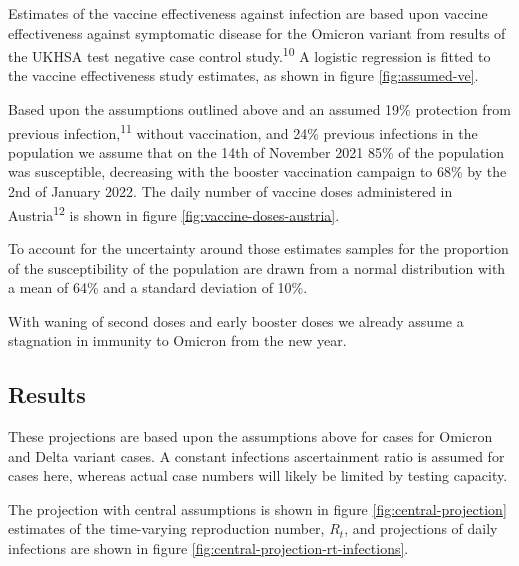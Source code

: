\documentclass[
]{article}
\begin{document}
Estimates of the vaccine effectiveness against infection are based upon vaccine effectiveness against
symptomatic disease for the Omicron variant from results of the UKHSA test negative case control study.\textsuperscript{10}
A logistic regression is fitted to the vaccine effectiveness study estimates, as shown in figure \ref{fig:assumed-ve}.

Based upon the assumptions outlined above and an assumed 19\% protection from previous infection,\textsuperscript{11} without vaccination, and 24\% previous infections in the population we assume that on the 14th of November 2021 85\% of the
population was susceptible, decreasing with the booster vaccination campaign to 68\% by the 2nd of January 2022.
The daily number of vaccine doses administered in Austria\textsuperscript{12} is shown in figure \ref{fig:vaccine-doses-austria}.

To account for the uncertainty around those estimates samples for the proportion of the susceptibility
of the population are drawn from a normal distribution with a mean of 64\% and a standard
deviation of 10\%.

With waning of second doses and early booster doses we already assume a stagnation in immunity
to Omicron from the new year.

\hypertarget{results}{%
\subsection{Results}\label{results}}

These projections are based upon the assumptions above for cases for Omicron and Delta variant cases.
A constant infections ascertainment ratio is assumed for cases here, whereas actual case numbers
will likely be limited by testing capacity.

The projection with central assumptions is shown in figure \ref{fig:central-projection}
estimates of the time-varying reproduction number, \(R_t\), and projections of daily
infections are shown in figure \ref{fig:central-projection-rt-infections}.
\end{document}

